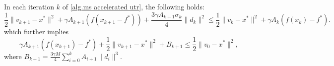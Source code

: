 \documentclass{article}
\begin{document}
\begin{lemma}\label{lem.ms estimate}
In each iteration $k$ of \autoref{alg.ms accelerated utr}, the following holds:
    \begin{equation}
        \label{eq.helper bounded x}
        \frac{1}{2}\|v_{k+1}-x^* \|^2 +\gamma A_{k+1}\left (f(x_{k+1}-f^*)\right)+ \frac{3\gamma A_{k+1}\sigma_k}{4}\|d_k\|^2 \leq \frac{1}{2}\|v_k-x^*\|^2 +\gamma A_k \left (f(x_k)-f^*\right).
    \end{equation}
    which further implies
    \begin{equation}
        \label{eq.ms estimate advanced}
        \gamma A_{k+1}\left (f(x_{k+1})-f^* \right) + \frac{1}{2}\|v_{k+1}-x^*\|^2 +B_{k+1} \leq \frac{1}{2}\|v_0-x^*\|^2,
    \end{equation}
    where $B_{k+1} = \frac{3\gamma M}{4}\sum_{i=0}^{k}A_{i+1}\|d_i\|^3.$
\end{lemma}
\end{document}
